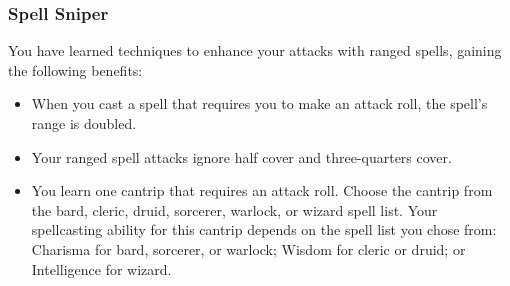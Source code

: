 
\subsubsection{Spell Sniper}
You have learned techniques to enhance your attacks with ranged spells, gaining the following benefits:
\begin{itemize}
    \item When you cast a spell that requires you to make an attack roll, the spell's range is doubled.
    \item Your ranged spell attacks ignore half cover and three-quarters cover.
    \item You learn one cantrip that requires an attack roll. Choose the cantrip from the bard, cleric, druid, sorcerer, warlock, or wizard spell list. Your spellcasting ability for this cantrip depends on the spell list you chose from: Charisma for bard, sorcerer, or warlock; Wisdom for cleric or druid; or Intelligence for wizard.
\end{itemize}
